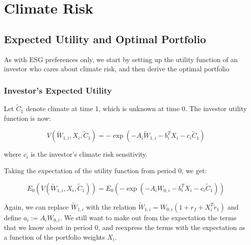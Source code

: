 \chapter{Climate Risk}


\section{Expected Utility and Optimal Portfolio}

As with ESG preferences only, 
we start by setting up the utility function of an investor
who cares about climate risk, and then derive the optimal portfolio

\subsection{Investor's Expected Utility}

Let $\tilde{C}_1$ denote climate at time 1, which is unknown at
time 0. The investor utility function is now:

\begin{equation}
    V(\tilde{W}_{1,i}, X_i, \tilde{C}_1) = -\exp{(-A_i \tilde{W}_{1,i} - b_i^T X_i - c_i \tilde{C}_1)}
\end{equation}

where $c_i$ is the investor's climate risk sensitivity.

Taking the expectation of the utility function from period 0,
we get: 

\begin{equation}
    E_0(V(\tilde{W}_{1,i}, X_i, \tilde{C}_1)) = E_0(-\exp{(-A_i W_{0,i} - b_i^T X_i - c_i \tilde{C}_1)})
\end{equation}

Again, we can replace $\tilde{W}_{1,i}$
with the relation $\tilde{W}_{1,i} = W_{0,i}(1 + r_f + X_i^T \tilde{r}_1)$
and define $a_i := A_i W_{0,i}$. 
We still want to make out from the expectation the 
terms that we know about in period 0, and 
reexpress the terms with the expectation as a function 
of the portfolio weights $X_i$. 

